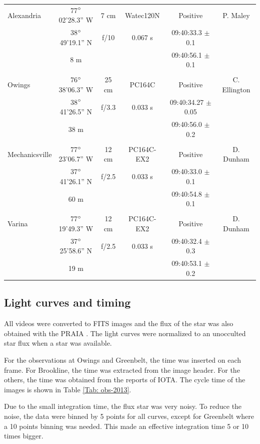 \documentclass[useAMS,usenatbib]{mn2e}
\begin{document}
\begin{table}
\begin{minipage}{140mm}
\begin{tabular}{@{}lccccc}
 Alexandria & 77$\hbox{$^\circ$}$02'28.3'' W & 7 cm & Watec120N & Positive & P. Maley \\
  &38$\hbox{$^\circ$}$49'19.1'' N & f/10 &  0.067 s   & 09:40:33.3 $\pm$ 0.1 &   \\
            & 8 m       &   &     & 09:40:56.1  $\pm$ 0.1 &   \\
 & & & & & \\
 Owings & 76$\hbox{$^\circ$}$38'06.3'' W & 25 cm & PC164C  & Positive & C. Ellington \\
  &38$\hbox{$^\circ$}$41'26.5'' N & f/3.3 &  0.033 s & 09:40:34.27 $\pm$ 0.05 &   \\
            & 38 m                &       &     & 09:40:56.0  $\pm$ 0.2 &   \\
 & & & & & \\
 Mechanicsville & 77$\hbox{$^\circ$}$23'06.7'' W & 12 cm & PC164C-EX2 & Positive & D. Dunham \\
  &37$\hbox{$^\circ$}$41'26.1'' N & f/2.5 & 0.033 s    & 09:40:33.0 $\pm$ 0.1 &   \\
            & 60 m      &   &     & 09:40:54.8  $\pm$ 0.1 &   \\
 & & & & & \\
 Varina & 77$\hbox{$^\circ$}$19'49.3'' W & 12 cm & PC164C-EX2 & Positive & D. Dunham \\
  &37$\hbox{$^\circ$}$25'58.6'' N & f/2.5 &  0.033 s   & 09:40:32.4 $\pm$ 0.3 &   \\
            & 19 m      &   &     & 09:40:53.1  $\pm$ 0.2 &   \\

\hline
\end{tabular}
\end{minipage}
\end{table}

\subsection{Light curves and timing}

All videos were converted to FITS images and the flux of the star was also obtained with the PRAIA \citep{2011gfun.conf...85A}. The light curves were normalized to an unocculted star flux when a star was available. 

For the observations at Owings and Greenbelt, the time was inserted on each frame. For Brookline, the time was extracted from the image header. For the others, the time was obtained from the reports of IOTA. The cycle time of the images is shown in Table \ref{Tab: obs-2013}.

Due to the small integration time, the flux star was very noisy. To reduce the noise, the data were binned by 5 points for all curves, except for Greenbelt where a 10 points binning was needed. This made an effective integration time 5 or 10 times bigger.
\end{document}
